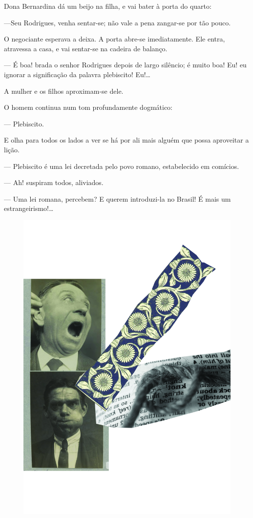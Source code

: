 Dona Bernardina dá um beijo na filha, e vai bater à porta do quarto:

---Seu Rodrigues, venha sentar-se; não vale a pena zangar-se por tão
pouco.

O negociante esperava a deixa. A porta abre-se imediatamente. Ele entra,
atravessa a casa, e vai sentar-se na cadeira de balanço.

--- É boa! brada o senhor Rodrigues depois de largo silêncio; é muito
boa! Eu! eu ignorar a significação da palavra plebiscito! Eu!\ldots{}

A mulher e os filhos aproximam-se dele.

O homem continua num tom profundamente dogmático:

--- Plebiscito.

E olha para todos os lados a ver se há por ali mais alguém que possa
aproveitar a lição.

--- Plebiscito é uma lei decretada pelo povo romano, estabelecido em
comícios.

--- Ah! suspiram todos, aliviados.

--- Uma lei romana, percebem? E querem introduzi-la no Brasil! É mais um
estrangeirismo!\ldots{}

\pagebreak
\thispagestyle{empty}
\begin{figure}
\includegraphics[width=\textwidth]{./ilustracoes/15_ASNEIRAS.jpg}
\end{figure}
\pagebreak

